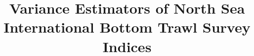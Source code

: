 \documentclass[a4paper 12pt]{article}
\title{\bf 
}
\author{}
\date{}
\numberwithin{equation}{section}
\begin{document}
\title{Variance Estimators of North Sea International Bottom Trawl Survey Indices}

\maketitle


\begin{abstract}

\end{abstract}




\clearpage
\end{document}
